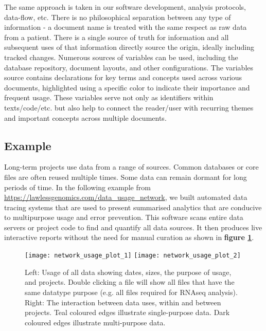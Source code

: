 The same approach is taken in our software development, analysis protocols, data-flow, etc. 
There is no philosophical separation between any type of information - 
a document name is treated with the same respect as raw data from a patient.
There is a single source of truth for information and all subsequent uses of that information directly source the origin, ideally including tracked changes. 
Numerous sources of variables can be used, including the database repository, 
document layouts, 
and other configurations. 
The variables source contains declarations for key terms and concepts used across various documents, highlighted using a specific color to indicate their importance and frequent usage.
These variables serve not only as identifiers within texts/code/etc. but also help to  connect the reader/user with recurring themes and important concepts across multiple documents. 


\subsection{Example}
Long-term projects use data from a range of sources. 
Common databases or core files are often reused multiple times. 
Some data can remain dormant for long periods of time. 
In the following example from
\url{https://lawlessgenomics.com/data_usage_network},
we built automated data tracing systems that are used to present summarised analytics that are conducive to multipurpose usage and error prevention. 
This software scans entire data servers or project code to find and quantify all data sources. 
It then produces live interactive reports without the need for manual curation as shown in 
\textbf{figure \ref{fig:network_usage_plot_1}}.

\begin{figure}[h] \hspace*{0cm} 
\begin{center}
	\texttt{[image: network\_usage\_plot\_1]}
	\texttt{[image: network\_usage\_plot\_2]}
	\caption{Left: Usage of all data showing dates, sizes, the purpose of usage, and projects. Double clicking a file will show all files that have the same datatype purpose (e.g. all files required for RNAseq analysis). Right: The interaction between data uses, within and between projects. Teal coloured edges illustrate single-purpose data. Dark coloured edges illustrate multi-purpose data.
}
	\label{fig:network_usage_plot_1}
\end{center}
\end{figure}

